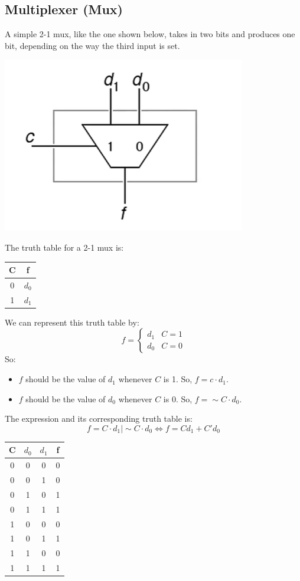 \documentclass[letterpaper]{article}
\begin{document}
\subsection{Multiplexer (Mux)}
A simple 2-1 mux, like the one shown below, takes in two bits and produces one bit, depending on the way the third input is set.
\begin{center}
    \includegraphics[scale=0.4]{mux.PNG}
\end{center}
The truth table for a 2-1 mux is:
\begin{center}
    \begin{tabular}{c|c}
        C & f \\ 
       \hline 
        0 & $d_0$ \\ 
        1 & $d_1$
    \end{tabular}
\end{center}
We can represent this truth table by:
\[f = \begin{cases}
    d_1 & C = 1 \\
    d_0 & C = 0
\end{cases}\]
So:
\begin{itemize}
    \item $f$ should be the value of $d_1$ whenever $C$ is 1. So, $f = c \cdot d_1$.
    \item $f$ should be the value of $d_0$ whenever $C$ is 0. So, $f = \sim C \cdot d_0$. 
\end{itemize}
The expression and its corresponding truth table is:
\[f = C \cdot d_1 \mid \sim C \cdot d_0 \iff f = Cd_1 + C'd_0\]
\begin{center}
    \begin{tabular}{c|c c|c}
        C & $d_0$ & $d_1$ & f \\ 
        \hline 
        0 & 0 & 0 & 0 \\ 
        0 & 0 & 1 & 0 \\ 
        0 & 1 & 0 & 1 \\ 
        0 & 1 & 1 & 1 \\ 
        1 & 0 & 0 & 0 \\ 
        1 & 0 & 1 & 1 \\ 
        1 & 1 & 0 & 0 \\ 
        1 & 1 & 1 & 1
    \end{tabular}
\end{center}
\end{document}
